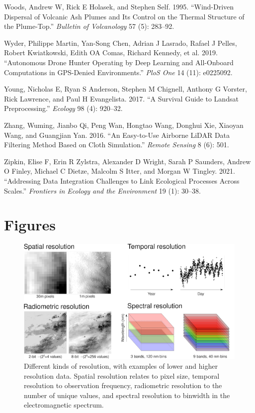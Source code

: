 \documentclass[
  12pt,
]{article}
\newlength{\cslhangindent}
\newlength{\cslentryspacingunit} %
\newenvironment{CSLReferences}[2] %
 {%
  \setlength{\parindent}{0pt}
  \ifodd #1
  \let\oldpar\par
  \def\par{\hangindent=\cslhangindent\oldpar}
  \fi
  \setlength{\parskip}{#2\cslentryspacingunit}
 }%
 {}
\begin{document}
\begin{CSLReferences}{1}{0}
\leavevmode{}%
Woods, Andrew W, Rick E Holasek, and Stephen Self. 1995. {``Wind-Driven
Dispersal of Volcanic Ash Plumes and Its Control on the Thermal
Structure of the Plume-Top.''} \emph{Bulletin of Volcanology} 57 (5):
283--92.

\leavevmode{}%
Wyder, Philippe Martin, Yan-Song Chen, Adrian J Lasrado, Rafael J
Pelles, Robert Kwiatkowski, Edith OA Comas, Richard Kennedy, et al.
2019. {``Autonomous Drone Hunter Operating by Deep Learning and
All-Onboard Computations in GPS-Denied Environments.''} \emph{PloS One}
14 (11): e0225092.

\leavevmode{}%
Young, Nicholas E, Ryan S Anderson, Stephen M Chignell, Anthony G
Vorster, Rick Lawrence, and Paul H Evangelista. 2017. {``A Survival
Guide to Landsat Preprocessing.''} \emph{Ecology} 98 (4): 920--32.

\leavevmode{}%
Zhang, Wuming, Jianbo Qi, Peng Wan, Hongtao Wang, Donghui Xie, Xiaoyan
Wang, and Guangjian Yan. 2016. {``An Easy-to-Use Airborne LiDAR Data
Filtering Method Based on Cloth Simulation.''} \emph{Remote Sensing} 8
(6): 501.

\leavevmode{}%
Zipkin, Elise F, Erin R Zylstra, Alexander D Wright, Sarah P Saunders,
Andrew O Finley, Michael C Dietze, Malcolm S Itter, and Morgan W
Tingley. 2021. {``Addressing Data Integration Challenges to Link
Ecological Processes Across Scales.''} \emph{Frontiers in Ecology and
the Environment} 19 (1): 30--38.

\end{CSLReferences}

\hypertarget{figures}{%
\section{Figures}\label{figures}}

\begin{figure}
\centering
\includegraphics{Figure1.png}
\caption{Different kinds of resolution, with examples of lower and
higher resolution data. Spatial resolution relates to pixel size,
temporal resolution to observation frequency, radiometric resolution to
the number of unique values, and spectral resolution to binwidth in the
electromagnetic spectrum.}
\end{figure}
\end{document}
